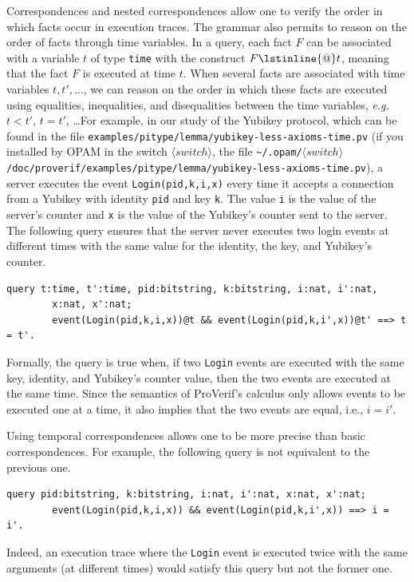 \documentclass{book}
\newcommand{\nonterm}[1]{\langle\mathit{#1}\rangle}
\newcommand{\switchdir}{\nonterm{switch}}
\newcommand{\opamsubdir}[1]{\nolinkurl{~/.opam/}$\switchdir$\nolinkurl{/#1}}
\begin{document}
Correspondences and nested correspondences allow one to verify the order in which facts occur in execution traces. The grammar also permits to reason on the order of facts through time variables. In a query, each fact $F$ can be associated with a variable $t$ of type \lstinline!time! with the construct $F\lstinline{@}t$, meaning that the fact $F$ is executed at time $t$. When several facts are associated with time variables $t,t',\ldots$, we can reason on the order in which these facts are executed using equalities, inequalities, and disequalities between the time variables, \emph{e.g.} $t < t'$, $t = t'$, \ldots For example, in our study of the Yubikey protocol, which can be found in the file \nolinkurl{examples/pitype/lemma/yubikey-less-axioms-time.pv} (if you installed by OPAM
in the switch $\switchdir$, the file \opamsubdir{doc/proverif/examples/pitype/lemma/yubikey-less-axioms-time.pv}), a server executes the event \lstinline!Login(pid,k,i,x)! every time it accepts a connection from a Yubikey with identity \lstinline!pid! and key \lstinline!k!. The value \lstinline!i! is the value of the server's counter and \lstinline!x! is the value of the Yubikey's counter sent to the server. The following query ensures that the server never executes two login events at different times with the same value for the identity, the key, and Yubikey's counter.

\begin{lstlisting}[numbers=none]
	query t:time, t':time, pid:bitstring, k:bitstring, i:nat, i':nat,
		x:nat, x':nat;
  		event(Login(pid,k,i,x))@t && event(Login(pid,k,i',x))@t' ==> t = t'.
\end{lstlisting}
Formally, the query is true when, if two \lstinline!Login! events are executed with the same key, identity, and Yubikey's counter value, then the two events are executed at the same time. Since the semantics of ProVerif's calculus only allows events to be executed one at a time, it also implies that the two events are equal, i.e., $i = i'$.

Using temporal correspondences allows one to be more precise than basic correspondences. For example, the following query is not equivalent to the previous one.
\begin{lstlisting}[numbers=none]
	query pid:bitstring, k:bitstring, i:nat, i':nat, x:nat, x':nat;
  		event(Login(pid,k,i,x)) && event(Login(pid,k,i',x)) ==> i = i'.
\end{lstlisting}
Indeed, an execution trace where the \lstinline!Login! event is executed twice with the same arguments (at different times) would satisfy this query but not the former one.
\end{document}
